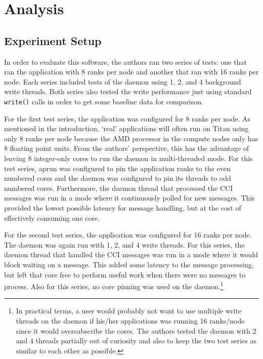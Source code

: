 \section{Analysis}
\label{sec:analysis}

\subsection{Experiment Setup}
\label{subsec:exp_setup}

In order to evaluate this software, the authors ran two series of tests: one that ran the application with 8 ranks per node and another that ran with 16 ranks per node.  Each series included tests of the daemon using 1, 2, and 4 background write threads.  Both series also tested the write performance just using standard \texttt{write()} calls in order to get some baseline data for comparison.

For the first test series, the application was configured for 8 ranks per node.  As mentioned in the introduction, `real' applications will often run on Titan using only 8 ranks per node because the AMD processor in the compute nodes only has 8 floating point units.  From the authors' perspective, this has the advantage of leaving 8 integer-only cores to run the daemon in multi-threaded mode.  For this test series, aprun was configured to pin the application ranks to the even numbered cores and the daemon was configured to pin its threads to odd numbered cores.  Furthermore, the daemon thread that processed the CCI messages was run in a mode where it continuously polled for new messages.  This  provided the lowest possible latency for message handling, but at the cost of effectively consuming one core. 

For the second test series, the application was configured for 16 ranks per node.  The daemon was again run with 1, 2, and 4 write threads.  For this series, the daemon thread that handled the CCI messages was run in a mode where it would block waiting on a message.  This added some latency to the message processing, but left that core free to perform useful work when there were no messages to process.  Also for this series, no core pinning was used on the daemon.\footnote{In practical terms, a user would probably not want to use multiple write threads on the daemon if his/her applications was running 16 ranks/node since it would oversubscribe the cores.  The authors tested the daemon with 2 and 4 threads partially out of curiosity and also to keep the two test series as similar to each other as possible.}   

